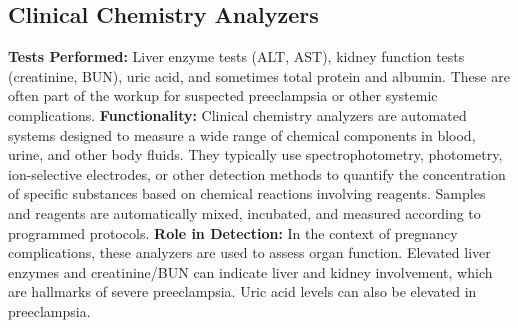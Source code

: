 \documentclass{article}
\begin{document}
\subsection{Clinical Chemistry Analyzers}
\textbf{Tests Performed:} Liver enzyme tests (ALT, AST), kidney function tests (creatinine, BUN), uric acid, and sometimes total protein and albumin. These are often part of the workup for suspected preeclampsia or other systemic complications.
\textbf{Functionality:} Clinical chemistry analyzers are automated systems designed to measure a wide range of chemical components in blood, urine, and other body fluids. They typically use spectrophotometry, photometry, ion-selective electrodes, or other detection methods to quantify the concentration of specific substances based on chemical reactions involving reagents. Samples and reagents are automatically mixed, incubated, and measured according to programmed protocols.
\textbf{Role in Detection:} In the context of pregnancy complications, these analyzers are used to assess organ function. Elevated liver enzymes and creatinine/BUN can indicate liver and kidney involvement, which are hallmarks of severe preeclampsia. Uric acid levels can also be elevated in preeclampsia.
\end{document}
